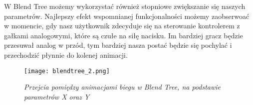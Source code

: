 W Blend Tree możemy wykorzystać również stopniowe zwiększanie się naszych parametrów. Najlepszy efekt wspomnianej funkcjonalności możemy zaobserwoać w momencie, gdy nasz użytkownik zdecyduje się na sterowanie kontrolerem z gałkami analogowymi, które są czułe na siłę nacisku. Im bardziej gracz będzie przesuwał analog w przód, tym bardziej nasza postać będzie się pochylać i przechodzić płynnie do kolenej animacji.

\begin{figure}[H]
    \center
    \texttt{[image: blendtree\_2.png]}
    \caption{ \textit{Przejcia pomiędzy animacjami biegu w Blend Tree, na podstawie parametrów X oraz Y}}
    \end{figure}

